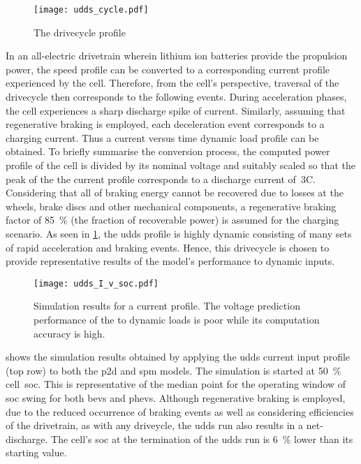 \begin{figure}[!htbp]
    \centering
    \texttt{[image: udds\_cycle.pdf]}
    \caption{The  drivecycle profile}
    \label{fig:uddsspeedvstimecycle}
\end{figure}

In  an  all-electric  drivetrain  wherein  lithium  ion  batteries  provide  the
propulsion power, the speed profile can  be converted to a corresponding current
profile  experienced  by  the  cell. Therefore,  from  the  cell's  perspective,
traversal of  the drivecycle  then corresponds to  the following  events. During
acceleration phases,  the cell experiences  a sharp discharge spike  of current.
Similarly,  assuming that  regenerative braking  is employed,  each deceleration
event corresponds to a charging current. Thus a current versus time dynamic load
profile  can be  obtained.  To  briefly summarise  the  conversion process,  the
computed  power profile  of  the cell  is  divided by  its  nominal voltage  and
suitably scaled  so that the  peak of the the  current profile corresponds  to a
discharge  current of~3C.  Considering that  all of  braking  energy cannot  be
recovered  due  to losses  at  the  wheels,  brake  discs and  other  mechanical
components,  a regenerative  braking factor  of \SI{85}{\percent}  (the fraction
of  recoverable  power)  is  assumed  for the  charging  scenario.  As  seen  in
\cref{fig:uddsspeedvstimecycle},  the  \gls{udds}   profile  is  highly  dynamic
consisting  of  many sets  of  rapid  acceleration  and braking  events.  Hence,
this  drivecycle is  chosen to  provide  representative results  of the  model's
performance to dynamic inputs.


\begin{figure}[!htbp]
    \centering
    \texttt{[image: udds\_I\_v\_soc.pdf]} %
    \caption[Simulation results of  and 
    models to  current profile]{Simulation results for a
         current profile. The voltage prediction performance
        of the  to dynamic loads is poor while its
     computation accuracy is high.}
    \label{fig:uddssimp2dspmresults}
\end{figure}

  shows   the  simulation  results   obtained  by
applying  the   \gls{udds}  current  input   profile  (top  row)  to   both  the
\gls{p2d} and \gls{spm}  models. The simulation is  started at \SI{50}{\percent}
cell~\gls{soc}. This  is representative  of the median  point for  the operating
window  of  \gls{soc} swing  for  both  \glspl{bev} and  \glspl{phev}.  Although
regenerative  braking is  employed, due  to  the reduced  occurrence of  braking
events  as well  as  considering efficiencies  of the  drivetrain,  as with  any
driveycle,  the \gls{udds}  run  also  results in  a  net-discharge. The  cell's
\gls{soc} at  the termination of  the \gls{udds} run  is \approx\SI{6}{\percent}
lower than its starting value.

